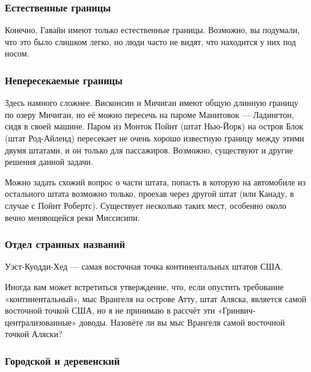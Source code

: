 \subsubsection*{Естественные границы}%

Конечно, Гавайи имеют только естественные границы.
Возможно, вы подумали, что это было слишком легко, но люди часто не видят, что находится у них под носом.
\heart

\subsubsection*{Непересекаемые границы}%

Здесь намного сложнее.
Висконсин и Мичиган имеют общую длинную границу по озеру Мичиган, но её можно пересечь на пароме Манитовок --- Ладингтон, сидя в своей машине.
Паром из Монток Пойнт %
(штат Нью-Йорк) на остров Блок %
(штат Род-Айленд) пересекает не очень хорошо известную границу между этими двумя штатами, и он только для пассажиров.
Возможно, существуют и другие решения данной задачи.\heart
                             

Можно задать схожий вопрос о части штата, попасть в которую на автомобиле из остального штата возможно только, проехав через другой штат (или Канаду, в случае с 
Пойнт Робертс). %
Существует несколько таких мест, особенно около вечно меняющейся реки Миссисипи.

\subsubsection*{Отдел странных названий}%

Уэст-Куодди-Хед %
--- самая восточная точка континентальных штатов США.\heart
                            

Иногда вам может встретиться утверждение, что, если опустить требование «континентальный», мыс Врангеля %
на острове Атту, %
штат Аляска, является самой восточной точкой США, но я не принимаю в рассчёт эти «Гринвич-централизованные» доводы.
Назовёте ли вы мыс Врангеля самой восточной точкой Аляски?

\subsubsection*{Городской и деревенский}%

